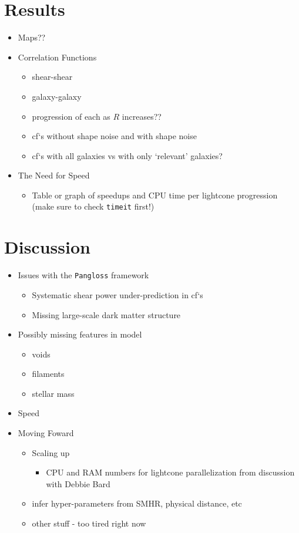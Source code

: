 \documentclass[%
 reprint,
 amsmath,amssymb,
 aps,
]{revtex4-1}
\begin{document}
\section{Results}

\begin{itemize}
\item Maps??
\item Correlation Functions
    \begin{itemize}
    \item shear-shear
    \item galaxy-galaxy
    \item progression of each as $R$ increases??
    \item cf`s without shape noise and with shape noise
    \item cf`s with all galaxies vs with only `relevant' galaxies?
    \end{itemize}
\item The Need for Speed
    \begin{itemize}
    \item Table or graph of speedups and CPU time per lightcone progression (make sure to check \texttt{timeit} first!)
    \end{itemize}
\end{itemize}

\section{Discussion}

\begin{itemize}
\item Issues with the \texttt{Pangloss} framework
    \begin{itemize}
    \item Systematic shear power under-prediction in cf`s
    \item Missing large-scale dark matter structure
    \end{itemize}
    \item Possibly missing features in model
        \begin{itemize}
        \item voids
        \item filaments
        \item stellar mass
        \end{itemize}
    \item Speed
\item Moving Foward
    \begin{itemize}
    \item Scaling up
        \begin{itemize}
        \item CPU and RAM numbers for lightcone parallelization from discussion with Debbie Bard
        \end{itemize}
    \item infer hyper-parameters from SMHR, physical distance, etc
    \item other stuff - too tired right now
    \end{itemize}
\end{itemize}
\end{document}
